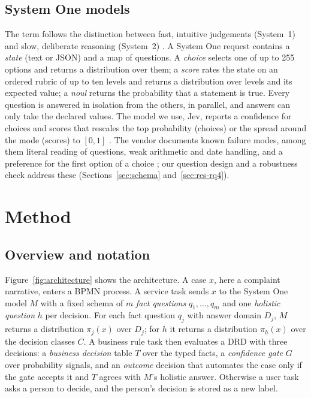 \documentclass[a4paper,fleqn]{cas-sc}
\theoremstyle{definition}
\newcommand{\jev}{Jev}
\begin{document}
\subsection{System One models}
The term follows the distinction between fast, intuitive judgements (System~1) and slow, deliberate reasoning (System~2) \citep{kahneman2011}. A System One request contains a \emph{state} (text or JSON) and a map of questions. A \emph{choice} selects one of up to 255 options and returns a distribution over them; a \emph{score} rates the state on an ordered rubric of up to ten levels and returns a distribution over levels and its expected value; a \emph{noul} returns the probability that a statement is true. Every question is answered in isolation from the others, in parallel, and answers can only take the declared values. The model we use, \jev{}, reports a confidence for choices and scores that rescales the top probability (choices) or the spread around the mode (scores) to $[0,1]$ \citep{typesafe2026docs}. The vendor documents known failure modes, among them literal reading of questions, weak arithmetic and date handling, and a preference for the first option of a choice \citep{typesafe2026jagged}; our question design and a robustness check address these (Sections~\ref{sec:schema} and~\ref{sec:res-rq4}).

\section{Method}\label{sec:method}

\subsection{Overview and notation}
Figure~\ref{fig:architecture} shows the architecture. A case $x$, here a complaint narrative, enters a BPMN process. A service task sends $x$ to the System One model $M$ with a fixed schema of $m$ \emph{fact questions} $q_1,\dots,q_m$ and one \emph{holistic question} $h$ per decision. For each fact question $q_j$ with answer domain $D_j$, $M$ returns a distribution $\pi_j(x)$ over $D_j$; for $h$ it returns a distribution $\pi_h(x)$ over the decision classes $C$. A business rule task then evaluates a DRD with three decisions: a \emph{business decision} table $T$ over the typed facts, a \emph{confidence gate} $G$ over probability signals, and an \emph{outcome} decision that automates the case only if the gate accepts it and $T$ agrees with $M$'s holistic answer. Otherwise a user task asks a person to decide, and the person's decision is stored as a new label.
\end{document}
